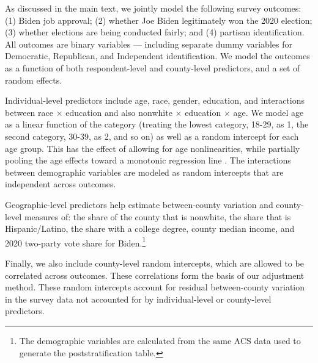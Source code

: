 As discussed in the main text, we jointly model the following survey outcomes: 
(1) Biden job approval; (2) whether Joe Biden legitimately won the 2020 election; (3) whether elections are being conducted fairly; and (4) partisan identification. 
All outcomes are binary variables --- including separate dummy variables for Democratic, Republican, and Independent identification. 
We model the outcomes as a function of both respondent-level  and county-level predictors, and a set of random effects.

Individual-level predictors include age, race, gender, education, and interactions between race $\times$ education and also nonwhite $\times$ education $\times$ age.
We model age as a linear function of the category (treating the lowest category, 18-29, as 1, the second category, 30-39, as 2, and so on) as well as a random intercept for each age group. 
This has the effect of allowing for age nonlinearities, while partially pooling the age effects toward a monotonic regression line  \citep{GG:2013}. 
The interactions between demographic variables are modeled as random intercepts that are independent across outcomes.

Geographic-level predictors help estimate between-county variation and county-level measures of: the share of the county that is nonwhite, the share that is Hispanic/Latino, the share with a college degree, county median income, and 2020 two-party vote share for Biden.\footnote{The demographic variables are calculated from the same ACS data used to generate the poststratification table.}

Finally, we also include county-level random intercepts, which are allowed to be correlated across outcomes.
These correlations form the basis of our adjustment method.
These random intercepts account for residual between-county variation in the survey data not accounted for by individual-level or county-level predictors. 

